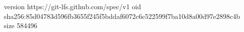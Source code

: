 version https://git-lfs.github.com/spec/v1
oid sha256:85d04783d596fb3655f245f5bddaf6072c6c522599f7ba10d8a00d97e2898c4b
size 584496
